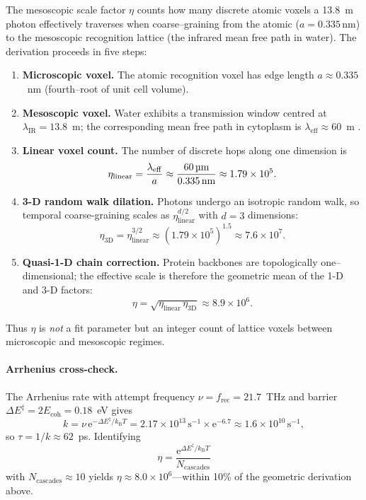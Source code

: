 \documentclass[12pt,twocolumn]{article}
\begin{document}
The mesoscopic scale factor $\eta$ counts how many discrete atomic voxels a 13.8~\textmu m photon effectively traverses 
when coarse--graining from the atomic (\(a = 0.335\,\text{nm}\)) to the mesoscopic recognition lattice (the infrared mean free path in water).
The derivation proceeds in five steps:
\begin{enumerate}[label=Step~\arabic*:,leftmargin=*]
  \item \textbf{Microscopic voxel.}  The atomic recognition voxel has edge length $a \approx 0.335$~nm (fourth--root of unit cell volume).
  \item \textbf{Mesoscopic voxel.}  Water exhibits a transmission window centred at $\lambda_{\mathrm{IR}}=13.8$~\textmu m; the corresponding mean free path in cytoplasm is $\lambda_{\mathrm{eff}}\approx60$~\textmu m \cite{HaleQuerry1973}.
  \item \textbf{Linear voxel count.}  The number of discrete hops along one dimension is
\begin{equation}
    \eta_{\mathrm{linear}} = \frac{\lambda_{\mathrm{eff}}}{a} \approx \frac{60\,\text{\textmu m}}{0.335\,\text{nm}} \approx 1.79\times10^{5}.
\end{equation}
  \item \textbf{3-D random walk dilation.}  Photons undergo an isotropic random walk, so temporal coarse-graining scales as $\eta_{\mathrm{linear}}^{d/2}$ with $d=3$ dimensions:
\begin{equation}
    \eta_{\mathrm{3D}} = \eta_{\mathrm{linear}}^{3/2} \approx (1.79\times10^{5})^{1.5} \approx 7.6\times10^{7}.
\end{equation}
  \item \textbf{Quasi-1-D chain correction.}  Protein backbones are topologically one–dimensional; the effective scale is therefore the geometric mean of the 1-D and 3-D factors:
\begin{equation}
    \eta = \sqrt{\eta_{\mathrm{linear}}\,\eta_{\mathrm{3D}}} \approx 8.9\times10^{6}.
\end{equation}
\end{enumerate}
Thus $\eta$ is \emph{not} a fit parameter but an integer count of lattice voxels between microscopic and mesoscopic regimes.

\paragraph{Arrhenius cross-check.}  The Arrhenius rate with attempt frequency $\nu=f_{\mathrm{rec}}=21.7$~THz and barrier $\Delta E^{\ddagger}=2E_{\mathrm{coh}}=0.18$~eV gives
\begin{equation}
  k = \nu\,\mathrm{e}^{-\Delta E^{\ddagger}/k_{\mathrm{B}}T}=2.17\times10^{13}\,\mathrm{s}^{-1}\times \mathrm{e}^{-6.7}\approx1.6\times10^{10}\,\mathrm{s}^{-1},
\end{equation}
so $\tau=1/k\approx62$~ps.  Identifying
\begin{equation}
  \eta=\frac{\mathrm{e}^{\Delta E^{\ddagger}/k_{\mathrm{B}}T}}{N_{\mathrm{cascades}}}
\end{equation}
with $N_{\mathrm{cascades}}\approx10$ yields $\eta\approx8.0\times10^{6}$—within 10\% of the geometric derivation above.
\end{document}
